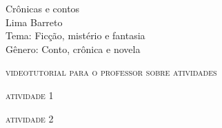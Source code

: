 \documentclass[smaller,professionalfonts,15pt]{beamer}
\begin{document}
										\begin{frame}\begin{raggedleft}
										\Huge 
Crônicas e contos						\\
										\huge 
Lima Barreto							\\
										\bigskip
										\normalsize
Tema: Ficção, mistério e fantasia		\\	
Gênero: Conto, crônica e novela			\\\vfill\hfill
\publishername
										\end{raggedleft}

\end{frame}


\begin{frame}{\textsc{videotutorial para o professor sobre atividades}}
\vspace{-2cm}\begin{figure}
\end{figure}
\end{frame}


\begin{frame}
\hfill\Huge
\textsc{atividade 1}
\end{frame}


\begin{frame}
\hfill\Huge
\textsc{atividade 2}
\end{frame}
\end{document}
